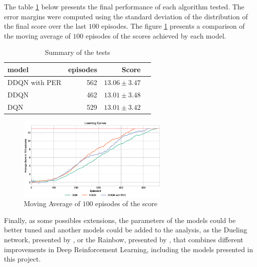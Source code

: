 \documentclass[a4paper]{article}
\begin{document}


The table \ref{tab:final_results} below presents the final performance of each algorithm tested. The error margins were computed using the standard deviation of the distribution of the final score over the last $100$ episodes. The figure \ref{fig:final_comp} presents a comparison of the moving average of $100$ episodes of the scores achieved by each model.

\begin{table}[ht!]
\centering
\begin{tabular}{lrrr}
{model} &  episodes &  Score \\
\midrule
DDQN with PER &       562 &       $13.06\pm3.47$ \\
DDQN          &       462 &       $13.01\pm3.48$ \\
DQN           &       529 &       $13.01\pm3.42$ \\

\end{tabular}
\caption{\label{tab:final_results}Summary of the tests}
\end{table}
\begin{figure}[ht]
\centering
\includegraphics[width=0.65\textwidth]{../notebooks/figures/2018-08-23-final-comparition-2.eps}
\caption{Moving Average of $100$ episodes of the score}
\label{fig:final_comp}
\end{figure}

Finally, as some possibles extensions, the parameters of the models could be better tuned and another models could be added to the analysis, as the Dueling network, presented by \cite{Wang:2015wz}, or the Rainbow, presented by \cite{Hessel:2017tw}, that  combines different improvements in Deep Reinforcement Learning, including the models presented in this project.








\end{document}
